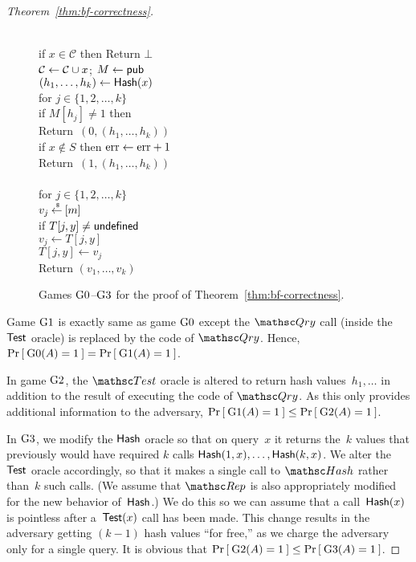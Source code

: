 \begin{proof}[Theorem~\ref{thm:bf-correctness}]
\begin{figure}[tp]
{{\\
if $x \in \mathcal{C}$ then Return $\bot$\\
${\cal C} \gets {\cal C} \cup x$; $M \gets{\sf pub}$\\
$(h_1, \ldots, h_{k}) \gets \mathsf{Hash}(x)$\\
for $j \in \{1,2,\ldots,k\}$\\
\nudge if $M[h_j] \neq 1$ then \\
\nudge \nudge Return~$(0, (h_1, \ldots, h_{k}) )$\\
if $x \not \in S$ then $\mathrm{err} \gets \mathrm{err} +1$\\
Return~$(1, (h_1, \ldots, h_{k}) )$\\

\\
for $j \in \{1,2,\ldots,k\}$\\
\nudge $v_j {\:\stackrel{{\scriptscriptstyle \hspace{0.2em}\$}} {\leftarrow}\:} [m]$\\
\nudge if $T[j,y] \neq \mathsf{undefined}$\\
\nudge \nudge $v_j \gets T[j,y]$\\
\nudge $T[j,y] \gets v_j$\\
Return $\left(v_1,\ldots,v_k\right)$ } } \caption{Games
$\text{G0}$--$\text{G3}$ for the proof of
Theorem~\ref{thm:bf-correctness}.} \label{fig:bf-correctness-games1}
\end{figure}


Game $\text{G1}$ is exactly same as game $\text{G0}$ except the $\Qry$
call (inside the $\mathsf{Test}$ oracle) is replaced by the code of
$\Qry$.  Hence, $\Pr\left[\: \text{G0}(A) = 1 \:\right] = \Pr\left[\: \text{G1}(A) = 1 \:\right]$.

In game $\text{G2}$, the $\Test$ oracle is altered to return hash
values~$h_1,\ldots$ in addition to the result of executing the code
of $\Qry$.  As this only provides additional information to the
adversary, $\Pr\left[\: \text{G1}(A) = 1 \:\right] \leq \Pr\left[\: \text{G2}(A) = 1 \:\right]$.


In $\text{G3}$, we modify the $\mathsf{Hash}$ oracle so that on
query~$x$ it returns the~$k$ values that previously would have
required $k$ calls $\mathsf{Hash}(1,x), \ldots, \mathsf{Hash}(k,x)$. We
alter the $\mathsf{Test}$ oracle accordingly, so that it makes a
single call to $\Hash$ rather than~$k$ such calls. (We assume that
$\Rep$ is also appropriately modified for the new behavior
of~$\mathsf{Hash}$.) We do this so we can assume that a
call~$\mathsf{Hash}(x)$ is pointless after a~$\mathsf{Test}(x)$ call has
been made. This change results in the adversary getting $(k-1)$ hash
values ``for free,'' as we charge the adversary only for a single
query.  It is obvious
that $\Pr\left[\: \text{G2}(A) = 1 \:\right] \leq \Pr\left[\: \text{G3}(A) = 1 \:\right]$.


\end{proof}
